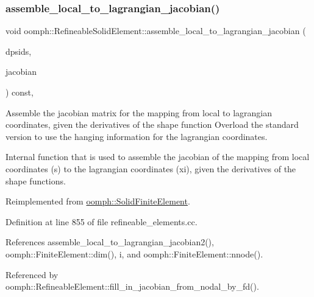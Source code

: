 \subsubsection{\texorpdfstring{assemble\+\_\+local\+\_\+to\+\_\+lagrangian\+\_\+jacobian()}{assemble\_local\_to\_lagrangian\_jacobian()}}
{\footnotesize\ttfamily void oomph\+::\+Refineable\+Solid\+Element\+::assemble\+\_\+local\+\_\+to\+\_\+lagrangian\+\_\+jacobian (\begin{DoxyParamCaption}\item[{const \hyperlink{classoomph_1_1DShape}{D\+Shape} \&}]{dpsids,  }\item[{\hyperlink{classoomph_1_1DenseMatrix}{Dense\+Matrix}$<$ double $>$ \&}]{jacobian }\end{DoxyParamCaption}) const\hspace{0.3cm}{\ttfamily [protected]}, {\ttfamily [virtual]}}



Assemble the jacobian matrix for the mapping from local to lagrangian coordinates, given the derivatives of the shape function Overload the standard version to use the hanging information for the lagrangian coordinates. 

Internal function that is used to assemble the jacobian of the mapping from local coordinates (s) to the lagrangian coordinates (xi), given the derivatives of the shape functions. 

Reimplemented from \hyperlink{classoomph_1_1SolidFiniteElement_a91f14d25d145e7ef47d55cabfd332f5c}{oomph\+::\+Solid\+Finite\+Element}.



Definition at line 855 of file refineable\+\_\+elements.\+cc.



References assemble\+\_\+local\+\_\+to\+\_\+lagrangian\+\_\+jacobian2(), oomph\+::\+Finite\+Element\+::dim(), i, and oomph\+::\+Finite\+Element\+::nnode().



Referenced by oomph\+::\+Refineable\+Element\+::fill\+\_\+in\+\_\+jacobian\+\_\+from\+\_\+nodal\+\_\+by\+\_\+fd().

\mbox{\label{classoomph_1_1RefineableSolidElement_a5843ecc4836508342150862e11af99f4}} 
